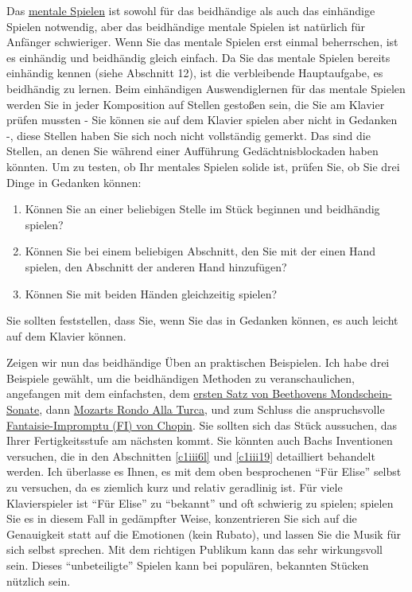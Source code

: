 Das \hyperref[c1ii12mental]{mentale Spielen} ist sowohl für das beidhändige als auch das einhändige Spielen notwendig, aber das beidhändige mentale Spielen ist natürlich für Anfänger schwieriger.
Wenn Sie das mentale Spielen erst einmal beherrschen, ist es einhändig und beidhändig gleich einfach.
Da Sie das mentale Spielen bereits einhändig kennen (siehe Abschnitt 12), ist die verbleibende Hauptaufgabe, es beidhändig zu lernen.
Beim einhändigen Auswendiglernen für das mentale Spielen werden Sie in jeder Komposition auf Stellen gestoßen sein, die Sie am Klavier prüfen mussten - Sie können sie auf dem Klavier spielen aber nicht in Gedanken -, diese Stellen haben Sie sich noch nicht vollständig gemerkt.
Das sind die Stellen, an denen Sie während einer Aufführung Gedächtnisblockaden haben könnten.
Um zu testen, ob Ihr mentales Spielen solide ist, prüfen Sie, ob Sie drei Dinge in Gedanken können:

\begin{enumerate}[label={\arabic*.}] 
 \item Können Sie an einer beliebigen Stelle im Stück beginnen und beidhändig spielen?
 \item Können Sie bei einem beliebigen Abschnitt, den Sie mit der einen Hand spielen, den Abschnitt der anderen Hand hinzufügen?
 \item Können Sie mit beiden Händen gleichzeitig spielen?
 \end{enumerate}
Sie sollten feststellen, dass Sie, wenn Sie das in Gedanken können, es auch leicht auf dem Klavier können.

Zeigen wir nun das beidhändige Üben an praktischen Beispielen.
Ich habe drei Beispiele gewählt, um die beidhändigen Methoden zu veranschaulichen, angefangen mit dem einfachsten, dem \hyperref[c1ii25b]{ersten Satz von Beethovens Mondschein-Sonate}, dann \hyperref[c1ii25c]{Mozarts Rondo Alla Turca}, und zum Schluss die anspruchsvolle \hyperref[c1ii25d]{Fantaisie-Impromptu (FI) von Chopin}.
Sie sollten sich das Stück aussuchen, das Ihrer Fertigkeitsstufe am nächsten kommt.
Sie könnten auch Bachs Inventionen versuchen, die in den Abschnitten \hyperref[c1iii6l]{\ref*{c1iii6l}} und \hyperref[c1iii19]{\ref*{c1iii19}} detailliert behandelt werden.
Ich überlasse es Ihnen, es mit dem oben besprochenen \enquote{Für Elise} selbst zu versuchen, da es ziemlich kurz und relativ geradlinig ist.
Für viele Klavierspieler ist \enquote{Für Elise} zu \enquote{bekannt} und oft schwierig zu spielen; spielen Sie es in diesem Fall in gedämpfter Weise, konzentrieren Sie sich auf die Genauigkeit statt auf die Emotionen (kein Rubato), und lassen Sie die Musik für sich selbst sprechen.
Mit dem richtigen Publikum kann das sehr wirkungsvoll sein.
Dieses \enquote{unbeteiligte} Spielen kann bei populären, bekannten Stücken nützlich sein.

